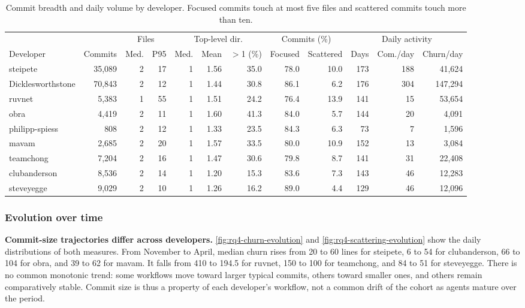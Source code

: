 \documentclass[smallextended]{svjour3}
\begin{document}
\begin{table}[tbp]
  \caption{Commit breadth and daily volume by developer. Focused commits touch at most
    five files and scattered commits touch more than ten.}
  \label{tab:rq4-breadth}
  \centering
  \scriptsize
  \setlength{\tabcolsep}{2.4pt}
  \begin{tabular}{lrrrrrrrrrrr}
    \toprule
    & & \multicolumn{2}{c}{Files} & \multicolumn{3}{c}{Top-level dir.} & \multicolumn{2}{c}{Commits (\%)} & \multicolumn{3}{c}{Daily activity} \\
    \cmidrule(lr){3-4}\cmidrule(lr){5-7}\cmidrule(lr){8-9}\cmidrule(lr){10-12}
    Developer & Commits & Med. & P95 & Med. & Mean & $>$1 (\%) & Focused & Scattered & Days & Com./day & Churn/day \\
    \midrule
    steipete & 35,089 & 2 & 17 & 1 & 1.56 & 35.0 & 78.0 & 10.0 & 173 & 188 & 41,624 \\
    Dicklesworthstone & 70,843 & 2 & 12 & 1 & 1.44 & 30.8 & 86.1 & 6.2 & 176 & 304 & 147,294 \\
    ruvnet & 5,383 & 1 & 55 & 1 & 1.51 & 24.2 & 76.4 & 13.9 & 141 & 15 & 53,654 \\
    obra & 4,419 & 2 & 11 & 1 & 1.60 & 41.3 & 84.0 & 5.7 & 144 & 20 & 4,091 \\
    philipp-spiess & 808 & 2 & 12 & 1 & 1.33 & 23.5 & 84.3 & 6.3 & 73 & 7 & 1,596 \\
    mavam & 2,685 & 2 & 20 & 1 & 1.57 & 33.5 & 80.0 & 10.9 & 152 & 13 & 3,084 \\
    teamchong & 7,204 & 2 & 16 & 1 & 1.47 & 30.6 & 79.8 & 8.7 & 141 & 31 & 22,408 \\
    clubanderson & 8,536 & 2 & 14 & 1 & 1.20 & 15.3 & 83.6 & 7.3 & 143 & 46 & 12,283 \\
    steveyegge & 9,029 & 2 & 10 & 1 & 1.26 & 16.2 & 89.0 & 4.4 & 129 & 46 & 12,096 \\
    \bottomrule
  \end{tabular}
\end{table}

\subsubsection{Evolution over time}

\textbf{Commit-size trajectories differ across developers.}
\autoref{fig:rq4-churn-evolution} and \autoref{fig:rq4-scattering-evolution}
show the daily distributions of both measures. From November to April, median churn rises from
20 to 60 lines for steipete, 6 to 54 for clubanderson, 66 to 104 for obra, and
39 to 62 for mavam. It falls from 410 to 194.5 for ruvnet, 150 to 100 for
teamchong, and 84 to 51 for steveyegge. There is no common monotonic trend:
some workflows move toward larger typical commits, others toward smaller ones,
and others remain comparatively stable.
Commit size is thus a property of each developer's workflow, not a common drift of the cohort as agents mature over the period.
\end{document}
